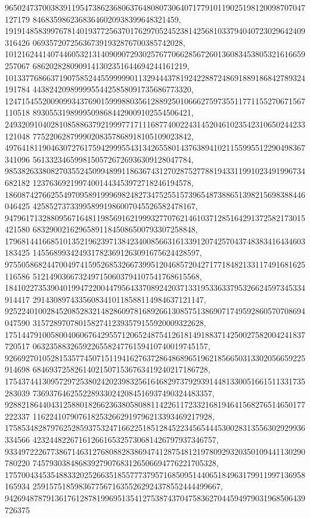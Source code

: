 \documentclass[12pt]{article}
\begin{document}
965024737003839119547386236806376480807306407177910119025198120098707047127179
84683598623683646020938399648321459, 
191914858399767814019377256370176297052452381425681033794040723029642409316426
069357207256367391932876700385742028, 
101216244140744605321314090907293025767706628567260136083453805321616659257067
6862028280909141302351644694244161219, 
101337768663719075852445599999011329444378192422887248691889186842789324191784
44382420989999554425858091735686773320, 
124715455200909934376901599988035612889250106662759735511771155270671567110518
89305531989995098684429009102554506421, 
249320910402810858863792199977171116877400224314520461023542310650244233121048
77522062879990208357868918105109023842, 
497641811904630727617594299955431342655801437638941021155995512290498367341096
56133234659981505726726936309128047784, 
985382633808270355245099489911863674312702875277881943311991023491996734682182
12376369219974001443453972718246194578, 
186087427662554970958919996982482734752551573965487388651398215698388446046425
425852737339958991986007045526582478167, 
947961713288095671648119856916219993277076214610371285164291372582173015421580
683290021629658911845086500793307258848, 
179681441668510135219623971384234008566316133912074257043748383416434603183425
1455689934249317823691263091675624428597, 
975505868244700497415952685326673995120468572042717718482133117491681625116586
5121490366732497150603794107541768615568, 
184102273539040199472200447956433708924203713319533633795326624597345334914417
29143089743356083410118588114984637121147, 
925224010028452085283214828609781689266130857513869071749592860570708694047590
31572897078015827412393579155920009322628, 
175144791005800406067642955712065248754126181491883714250027582004241837720517
063235883265922655824776159410740019745157, 
926692701052815357745071511941627637286486896519621856650313302056659225914698
684693725826140215071536763419240217186728, 
175437441309572972538024202398325616468297379293914481330051661511331735283039
7369376462552289330242084516937490324483357, 
928821864404312588018266236380580881142261172332168194641568276514650177222337
1162241079076182532662919796213393469217928, 
175853482879762528593753247166225185128452234565444530028313556302929936334566
42324482267161266165325730681426797937346757, 
933497222677386714631276808828386947412875481219780929320350109441130290780220
74579303848683927907683126506694776221705328, 
175700434535488332025266351855777379571685095144065184963179911997136958165934
259157518598367756716355262924378552444499667, 
942694878791361761287819969513541275387437047583627044594979031968506439726375
\end{document}
